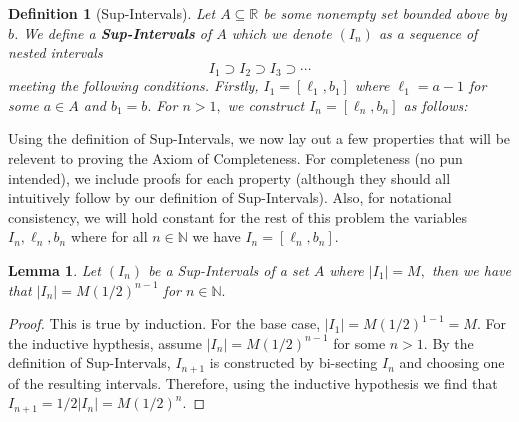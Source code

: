 \documentclass[10pt]{article}
\newtheorem{lemma}[]{Lemma}
\newtheorem{definition}[]{Definition}
\begin{document}
\begin{definition}[Sup-Intervals] \label{def:sup}
    Let $A\subseteq \mathbb{R}$ be some nonempty set bounded above by $b$.  We define a \textbf{Sup-Intervals} of $A$ which we denote $(I_n)$ as a sequence of nested intervals
    \[I_1\supset I_2\supset I_3 \supset \cdots \]
    meeting the following conditions.
    Firstly, $I_1 = [\ell_1, b_1]$ where $\ell_1 = a-1$ for some $a\in A$ and $b_1 = b.$  For $n>1,$ we construct $I_n = [\ell_n, b_n]$ as follows:

    \begin{center}
    \end{center}
\end{definition}


Using the definition of Sup-Intervals, we now lay out a few properties that will be relevent to proving the Axiom of Completeness. For completeness (no pun intended), we include proofs for each property (although they should all intuitively follow by our definition of Sup-Intervals). Also, for notational consistency, we will hold constant for the rest of this problem the variables $I_n,\ell_n,b_n$ where for all $n\in\mathbb{N}$ we have $I_n=[\ell_n,b_n].$ 

\begin{lemma} \label{lem:len}
    Let $(I_n)$ be a Sup-Intervals of a set $A$ where $|I_1|=M,$ then we have that $|I_n|=M(1/2)^{n-1}$ for $n\in\mathbb{N}.$
\end{lemma}

\begin{proof}
    This is true by induction. For the base case, $|I_1|=M(1/2)^{1-1}=M.$ For the inductive hypthesis, assume $|I_n|=M(1/2)^{n-1}$ for some $n>1$. By the definition of Sup-Intervals, $I_{n+1}$ is constructed by  bi-secting $I_n$ and choosing one of the resulting intervals. Therefore, using the inductive hypothesis we find that $I_{n+1}=1/2|I_n|=M(1/2)^n.$
\end{proof}
\end{document}
